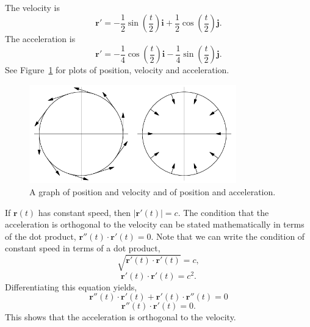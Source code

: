 \begin{Solution}
  \label{solution parametric cos t/2 + sin t/2}
  The velocity is 
  \[
  \mathbf{r}' = - \frac{1}{2} \sin \left( \frac{t}{2} \right) \mathbf{i} 
  + \frac{1}{2} \cos \left( \frac{t}{2} \right) \mathbf{j}.
  \]  
  The acceleration is 
  \[
  \mathbf{r}' = - \frac{1}{4} \cos \left( \frac{t}{2} \right) \mathbf{i} 
  - \frac{1}{4} \sin \left( \frac{t}{2} \right) \mathbf{j}.
  \]  
  See Figure~\ref{circleva} for plots of position, velocity and acceleration.

  \begin{figure}[h!]
    \begin{center}
      \includegraphics[width=0.8\textwidth]{calculus/vector/circleva}
    \end{center}
    \caption{A graph of position and velocity and of position and 
      acceleration.}
    \label{circleva}
  \end{figure}
\end{Solution}






\begin{Solution}
  \label{solution constant speed acceleration orthogonal}
  If $\mathbf{r}(t)$ has constant speed, then $| \mathbf{r}'(t) | = c$.
  The condition that the acceleration is orthogonal to the
  velocity can be stated mathematically in terms of the dot product,
  $\mathbf{r}''(t) \cdot \mathbf{r}'(t) = 0$.  Note that we can write the condition
  of constant speed in terms of a dot product, 
  \[
  \sqrt{ \mathbf{r}'(t) \cdot \mathbf{r}'(t) } = c,
  \]
  \[
  \mathbf{r}'(t) \cdot \mathbf{r}'(t) = c^2.
  \]
  Differentiating this equation yields,
  \[
  \mathbf{r}''(t) \cdot \mathbf{r}'(t) + \mathbf{r}'(t) \cdot \mathbf{r}''(t) = 0
  \]
  \[
  \mathbf{r}''(t) \cdot \mathbf{r}'(t) = 0.
  \]
  This shows that the acceleration is orthogonal to the velocity.
\end{Solution}






